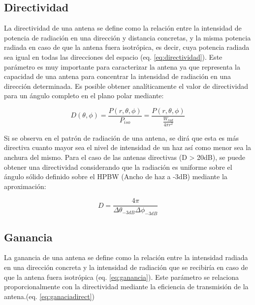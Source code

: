 \subsection{Directividad}

\par La directividad de una antena se define como la relación entre la intensidad de potencia de radiación en una dirección y distancia concretas, y la misma potencia radiada en caso de que la antena fuera isotrópica, es decir, cuya potencia radiada sea igual en todas las direcciones del espacio (eq. \ref{eq:directividad}). Este parámetro es muy importante para caracterizar la antena ya que representa la capacidad de una antena para concentrar la intensidad de radiación en una dirección determinada. Es posible obtener analíticamente el valor de directividad para un ángulo completo en el plano polar mediante:

\begin{equation}
	D(\theta, \phi )=\frac{P(r,\theta ,\phi)}{P_{iso}}= \frac{P(r,\theta ,\phi)}{\frac{W_{rad}}{4\pi r^{2}}}
	\label{eq:directividad}
\end{equation}

\par Si se observa en el patrón de radiación de una antena, se dirá que esta es más directiva cuanto mayor sea el nivel de intensidad de un haz así como menor sea la anchura del mismo. Para el caso de las antenas directivas (D > 20dB), se puede obtener una directividad considerando que la radiación es uniforme sobre el ángulo sólido definido sobre el HPBW (Ancho de haz a -3dB) mediante la aproximación:

\begin{equation}
	D=\frac{4\pi}{\Delta \theta _{-3dB} \Delta \phi _{-3dB}}
	\label{eq:directividadaprox}
\end{equation}

\subsection{Ganancia}

\par La ganancia de una antena se define como la relación entre la intensidad radiada en una dirección concreta y la intensidad de radiación que se recibiría en caso de que la antena fuera isotrópica (eq. \ref{eq:ganancia}). Este parámetro se relaciona proporcionalmente con la directividad mediante la eficiencia de transmisión de la antena.(eq. \ref{eq:ganaciadirect})


